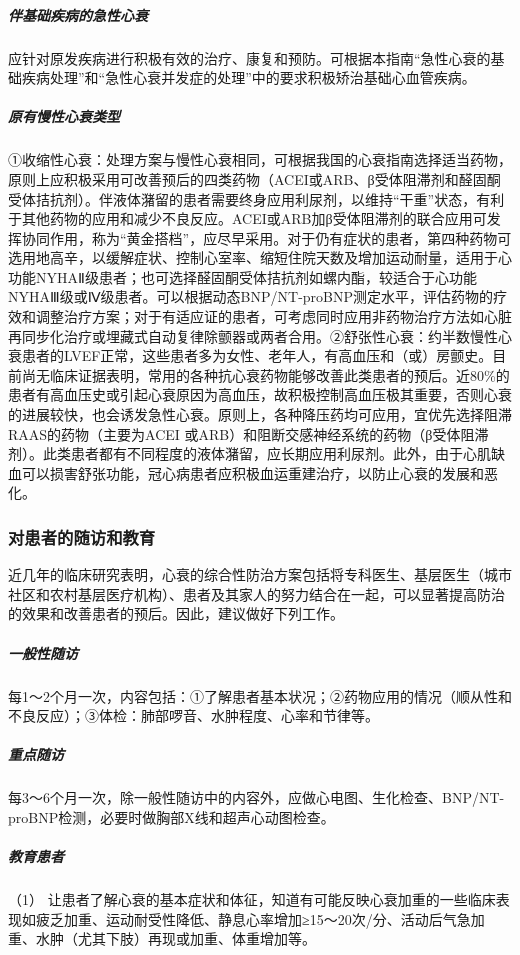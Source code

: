 \subparagraph{伴基础疾病的急性心衰}

应针对原发疾病进行积极有效的治疗、康复和预防。可根据本指南“急性心衰的基础疾病处理”和“急性心衰并发症的处理”中的要求积极矫治基础心血管疾病。

\subparagraph{原有慢性心衰类型}

①收缩性心衰：处理方案与慢性心衰相同，可根据我国的心衰指南选择适当药物，原则上应积极采用可改善预后的四类药物（ACEI或ARB、β受体阻滞剂和醛固酮受体拮抗剂）。伴液体潴留的患者需要终身应用利尿剂，以维持“干重”状态，有利于其他药物的应用和减少不良反应。ACEI或ARB加β受体阻滞剂的联合应用可发挥协同作用，称为“黄金搭档”，应尽早采用。对于仍有症状的患者，第四种药物可选用地高辛，以缓解症状、控制心室率、缩短住院天数及增加运动耐量，适用于心功能NYHAⅡ级患者；也可选择醛固酮受体拮抗剂如螺内酯，较适合于心功能NYHAⅢ级或Ⅳ级患者。可以根据动态BNP/NT-proBNP测定水平，评估药物的疗效和调整治疗方案；对于有适应证的患者，可考虑同时应用非药物治疗方法如心脏再同步化治疗或埋藏式自动复律除颤器或两者合用。②舒张性心衰：约半数慢性心衰患者的LVEF正常，这些患者多为女性、老年人，有高血压和（或）房颤史。目前尚无临床证据表明，常用的各种抗心衰药物能够改善此类患者的预后。近80\%的患者有高血压史或引起心衰原因为高血压，故积极控制高血压极其重要，否则心衰的进展较快，也会诱发急性心衰。原则上，各种降压药均可应用，宜优先选择阻滞RAAS的药物（主要为ACEI
或ARB）和阻断交感神经系统的药物（β受体阻滞剂）。此类患者都有不同程度的液体潴留，应长期应用利尿剂。此外，由于心肌缺血可以损害舒张功能，冠心病患者应积极血运重建治疗，以防止心衰的发展和恶化。

\subsubsection{对患者的随访和教育}

近几年的临床研究表明，心衰的综合性防治方案包括将专科医生、基层医生（城市社区和农村基层医疗机构）、患者及其家人的努力结合在一起，可以显著提高防治的效果和改善患者的预后。因此，建议做好下列工作。

\subparagraph{一般性随访}

每1～2个月一次，内容包括：①了解患者基本状况；②药物应用的情况（顺从性和不良反应）；③体检：肺部啰音、水肿程度、心率和节律等。

\subparagraph{重点随访}

每3～6个月一次，除一般性随访中的内容外，应做心电图、生化检查、BNP/NT-proBNP检测，必要时做胸部X线和超声心动图检查。

\subparagraph{教育患者}

（1）
让患者了解心衰的基本症状和体征，知道有可能反映心衰加重的一些临床表现如疲乏加重、运动耐受性降低、静息心率增加≥15～20次/分、活动后气急加重、水肿（尤其下肢）再现或加重、体重增加等。

